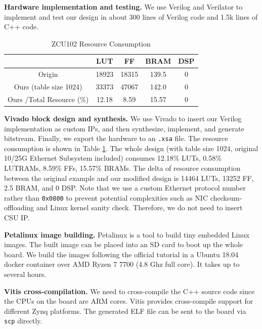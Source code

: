 \textbf{Hardware implementation and testing.} We use Verilog and Verilator to implement and test our design in about 300 lines of Verilog code and 1.5k lines of C++ code. 


\begin{table}
    \caption{ZCU102 Resource Consumption}
    \label{tab:res}
    \begin{tabular}{c|cccc}
      \toprule
        &LUT&FF&BRAM&DSP\\
      \midrule
      Origin & 18923 & 18315 & 139.5 & 0\\
      Ours (table size 1024) & 33373 & 47067 & 142.0 & 0\\

      \midrule
      Ours \slash Total Resource (\%) & 12.18 & 8.59 & 15.57 & 0\\

    \bottomrule
  \end{tabular}
\end{table}

\textbf{Vivado block design and synthesis.} We use Vivado to insert our Verilog implementation as custom IPs, and then synthesize, implement, and generate bitstream. Finally, we export the hardware to an \verb|.xsa| file. 
The resource consumption is shown in Table \ref{tab:res}.
The whole design (with table size 1024, original 10/25G Ethernet Subsystem included) consumes 12.18\% LUTs, 0.58\% LUTRAMs, 8.59\% FFs, 15.57\% BRAMs.
The delta of resource consumption between the original example and our modified design is 14464 LUTs, 13252 FF, 2.5 BRAM, and 0 DSP.
Note that we use a custom Ethernet protocol number rather than \verb|0x0800| to prevent potential complexities such as NIC checksum-offloading and Linux kernel sanity check. Therefore, we do not need to insert CSU IP.

\textbf{Petalinux image building.} Petalinux is a tool to build tiny embedded Linux images.
The built image can be placed into an SD card to boot up the whole board. 
We build the images following the official tutorial in a Ubuntu 18.04 docker container over AMD Ryzen 7 7700 (4.8 Ghz full core). It takes up to several hours.

\textbf{Vitis cross-compilation.} We need to cross-compile the C++ source code since the CPUs on the board are ARM cores. Vitis provides cross-compile support for different Zynq platforms. The generated ELF file can be sent to the board via \verb|scp| directly.






